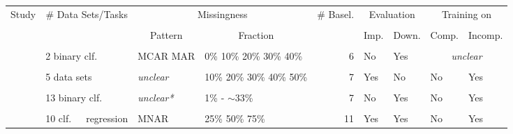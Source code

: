 \begin{table}[]
	\centering
	\begin{tabular}{@{}p{2.5cm}p{3cm}p{1.5cm}p{1cm}rllll@{}}
		\toprule
		\multicolumn{1}{c}{\multirow{2}{*}{Study}} & \multicolumn{1}{c}{\multirow{2}{*}{\# Data Sets/Tasks}}  & \multicolumn{2}{c}{Missingness}                            & \multicolumn{1}{c}{\multirow{2}{*}{\# Basel.}} & \multicolumn{2}{c}{Evaluation}                       & \multicolumn{2}{c}{Training on}                         \\
		\\[-0.75em]
		\multicolumn{1}{c}{}                      & \multicolumn{1}{c}{}                       & \multicolumn{1}{c}{Pattern} & \multicolumn{1}{c}{Fraction} & \multicolumn{1}{c}{}                                   & \multicolumn{1}{c}{Imp.} & \multicolumn{1}{c}{Down.} & \multicolumn{1}{c}{Comp.} & \multicolumn{1}{c}{Incomp.} \\ \midrule
		\\[-.5em]
		\cite{Imputation_Benchmark_3}                                         & 2 binary clf.                                     & MCAR MAR                   & 0\% 10\% 20\% 30\% 40\%  & 6                                                      & No                       & Yes                       & \multicolumn{2}{c}{\emph{unclear}}                             \\
		\\[-.5em]
		\cite{Imputation_Benchmark_2}                                         & 5 data sets                                    & \emph{unclear}                     & 10\% 20\% 30\% 40\% 50\% & 7                                                      & Yes                      & No                        & No                        & Yes                         \\
		\\[-.5em]
		\cite{Imputation_Benchmark_1}                                         & 13 binary clf.                   & \emph{unclear*}                    & 1\% - $\sim$33\%            & 7                                                      & No                       & Yes                       & No                        & Yes                         \\
		\\[-.5em]
		\cite{Imputation_Benchmark_6}                                         & 10 clf.\newline 3~~~regression                            & MNAR                        & 25\% 50\% 75\%             & 11                                                     & Yes                      & Yes                       & No                        & Yes                         \\

\end{tabular}
\end{table}
